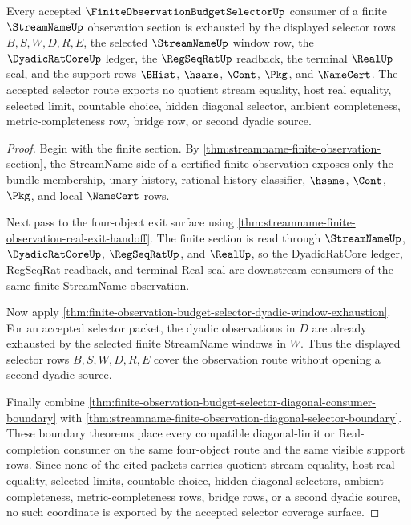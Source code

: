 \begin{theorem}
\label{thm:streamname-finite-observation-selector-coverage-exhaustion}
Every accepted $\FiniteObservationBudgetSelectorUp$ consumer of a finite
$\StreamNameUp$ observation section is exhausted by the displayed selector rows
$B,S,W,D,R,E$, the selected $\StreamNameUp$ window row, the
$\DyadicRatCoreUp$ ledger, the $\RegSeqRatUp$ readback, the terminal
$\RealUp$ seal, and the support rows $\BHist$, $\hsame$, $\Cont$, $\Pkg$, and
$\NameCert$. The accepted selector route exports no quotient stream equality,
host real equality, selected limit, countable choice, hidden diagonal selector,
ambient completeness, metric-completeness row, bridge row, or second dyadic
source.
\end{theorem}
\begin{proof}
Begin with the finite section. By
\autoref{thm:streamname-finite-observation-section}, the StreamName side of a
certified finite observation exposes only the bundle membership, unary-history,
rational-history classifier, $\hsame$, $\Cont$, $\Pkg$, and local $\NameCert$
rows.

Next pass to the four-object exit surface using
\autoref{thm:streamname-finite-observation-real-exit-handoff}. The finite
section is read through $\StreamNameUp$, $\DyadicRatCoreUp$, $\RegSeqRatUp$,
and $\RealUp$, so the DyadicRatCore ledger, RegSeqRat readback, and terminal
Real seal are downstream consumers of the same finite StreamName observation.

Now apply
\autoref{thm:finite-observation-budget-selector-dyadic-window-exhaustion}. For
an accepted selector packet, the dyadic observations in $D$ are already
exhausted by the selected finite StreamName windows in $W$. Thus the displayed
selector rows $B,S,W,D,R,E$ cover the observation route without opening a
second dyadic source.

Finally combine
\autoref{thm:finite-observation-budget-selector-diagonal-consumer-boundary}
with
\autoref{thm:streamname-finite-observation-diagonal-selector-boundary}. These
boundary theorems place every compatible diagonal-limit or Real-completion
consumer on the same four-object route and the same visible support rows. Since
none of the cited packets carries quotient stream equality, host real equality,
selected limits, countable choice, hidden diagonal selectors, ambient
completeness, metric-completeness rows, bridge rows, or a second dyadic source,
no such coordinate is exported by the accepted selector coverage surface.
\end{proof}

